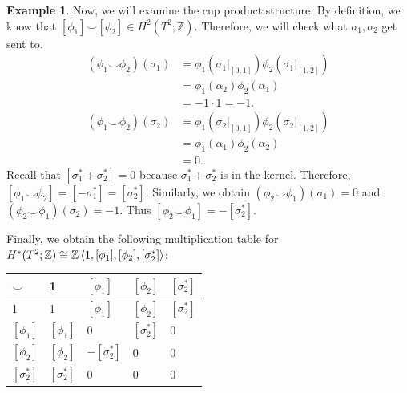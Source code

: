 \documentclass[psamsfonts]{amsart}
\theoremstyle{definition}
\newtheorem{exmp}[thm]{Example}
\theoremstyle{rem}
\numberwithin{equation}{section}
\begin{document}
\begin{exmp}
  Now, we will examine the cup product structure.
  By definition, we know that $[\phi_1] \smile [\phi_2] \in H^2(T^2; \mathbb{Z})$.
  Therefore, we will check what $\sigma_1, \sigma_2$ get sent to.
  \begin{align*}
    (\phi_1 \smile \phi_2)(\sigma_1)
      &= \phi_1(\sigma_1\vert_{[0, 1]})\phi_2(\sigma_1\vert_{[1, 2]}) \\
      &= \phi_1(\alpha_2)\phi_2(\alpha_1) \\
      &= -1 \cdot 1 = -1. \\
    (\phi_1 \smile \phi_2)(\sigma_2)
      &= \phi_1(\sigma_2\vert_{[0, 1]})\phi_2(\sigma_2\vert_{[1, 2]}) \\
      &= \phi_1(\alpha_1)\phi_2(\alpha_2) \\
      &= 0.
  \end{align*}
  Recall that $[\sigma_1^{\ast} + \sigma_2^{\ast}] = 0$ because $\sigma_1^{\ast} + \sigma_2^{\ast}$ is in the kernel.
  Therefore, $[\phi_1 \smile \phi_2] = [-\sigma_1^{\ast}] = [\sigma_2^{\ast}]$.
  Similarly, we obtain $(\phi_2 \smile \phi_1)(\sigma_1) = 0$ and $(\phi_2 \smile \phi_1)(\sigma_2) = -1$.
  Thus $[\phi_2 \smile \phi_1] = -[\sigma_2^{\ast}]$.


  Finally, we obtain the following multiplication table for $H^{\ast}(T^2; \mathbb{Z}) \cong \mathbb{Z}\ev{1, [\phi_1], [\phi_2], [\sigma_2^{\ast}]}$:
  \begin{center}
    \begin{tabular}{| l || l | l | l | l |} \hline
      $\smile$   & 1          & $[\phi_1]$           & $[\phi_2]$          & $[\sigma_2^{\ast}]$ \\ \hline
      1          & 1          & $[\phi_1]$           & $[\phi_2]$          & $[\sigma_2^{\ast}]$ \\ 
      $[\phi_1]$ & $[\phi_1]$ & 0                    & $[\sigma_2^{\ast}]$ & 0 \\ 
      $[\phi_2]$ & $[\phi_2]$ & $-[\sigma_2^{\ast}]$ & 0                   & 0 \\
      $[\sigma_2^{\ast}]$ & $[\sigma_2^{\ast}]$ & 0                    & 0                   & 0 \\ \hline
    \end{tabular}
  \end{center}
\end{exmp}
\end{document}
